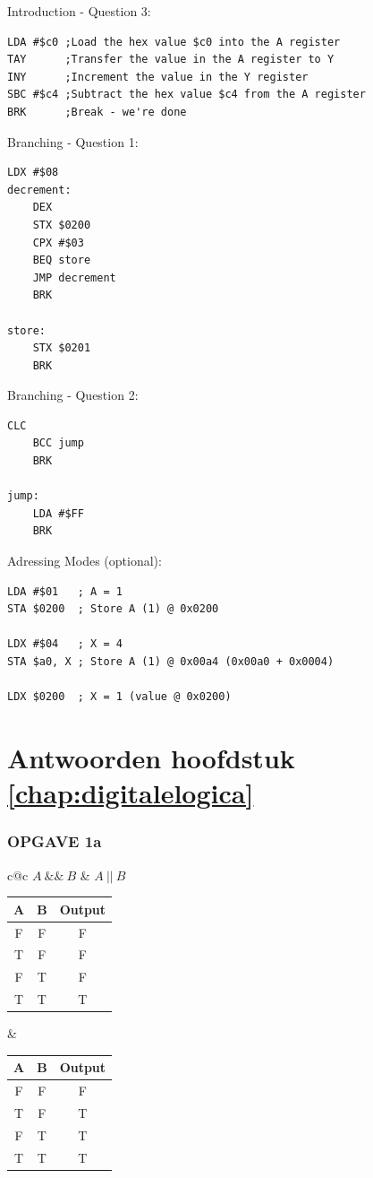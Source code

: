 Introduction - Question 3:
\begin{lstlisting}[language=asm6502]
LDA #$c0 ;Load the hex value $c0 into the A register
TAY      ;Transfer the value in the A register to Y
INY      ;Increment the value in the Y register
SBC #$c4 ;Subtract the hex value $c4 from the A register
BRK      ;Break - we're done
\end{lstlisting}

Branching - Question 1:
\begin{lstlisting}[language=asm6502]
    LDX #$08
decrement:
    DEX
    STX $0200
    CPX #$03
    BEQ store
    JMP decrement
    BRK

store:
    STX $0201
    BRK
\end{lstlisting}

Branching - Question 2:
\begin{lstlisting}[language=asm6502]
    CLC
    BCC jump
    BRK
    
jump:
    LDA #$FF
    BRK
\end{lstlisting}

Adressing Modes (optional):
\begin{lstlisting}[language=asm6502]
LDA #$01   ; A = 1
STA $0200  ; Store A (1) @ 0x0200

LDX #$04   ; X = 4
STA $a0, X ; Store A (1) @ 0x00a4 (0x00a0 + 0x0004)

LDX $0200  ; X = 1 (value @ 0x0200)
\end{lstlisting}

\newpage
\section{Antwoorden hoofdstuk \ref{chap:digitalelogica}}
\subsubsection{OPGAVE 1a}
\begin{center}
\begin{tabular}{c@{\qquad \qquad \qquad}c}
    $A\ \&\&\ B$   &   $A\ ||\ B$ \\
    \begin{tabular}[t]{|c|c|c|}
        \hline
        A & B & Output \\
        \hline \hline
        F & F & F \\
        T & F & F \\
        F & T & F \\
        T & T & T \\
        \hline
    \end{tabular}
    &
    \begin{tabular}[t]{|c|c|c|}
        \hline
        A & B & Output \\
        \hline \hline
        F & F & F \\
        T & F & T \\
        F & T & T \\
        T & T & T \\
        \hline
    \end{tabular}
\end{tabular}
\end{center}

